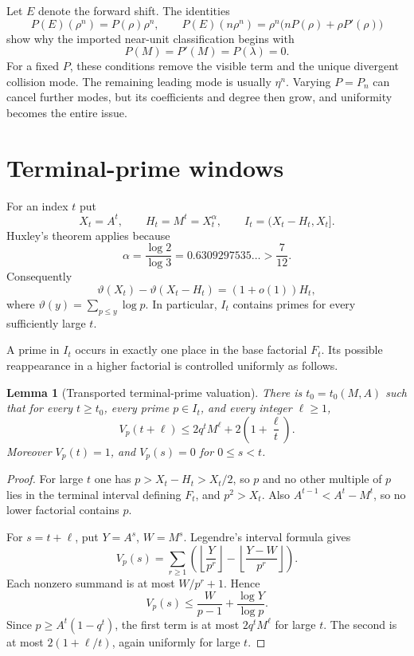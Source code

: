 \documentclass[11pt,oneside]{article}
\newtheorem{lemma}[theorem]{Lemma}
\theoremstyle{definition}
\theoremstyle{remark}
\newcommand{\thetas}{\vartheta}
\begin{document}
Let $E$ denote the forward shift.  The identities
\[
 P(E)(\rho^n)=P(\rho)\rho^n,
 \qquad
 P(E)(n\rho^n)=\rho^n\bigl(nP(\rho)+\rho P'(\rho)\bigr)
\]
show why the imported near-unit classification begins with
\[
 P(M)=P'(M)=P(\lambda)=0.                    \label{eq:basic-annihilation}
\]
For a fixed $P$, these conditions remove the visible term and the unique divergent collision
mode.  The remaining leading mode is usually $\eta^n$.  Varying $P=P_n$ can cancel further
modes, but its coefficients and degree then grow, and uniformity becomes the entire issue.

\section{Terminal-prime windows}
\label{sec:windows}

For an index $t$ put
\[
 X_t=A^t,\qquad H_t=M^t=X_t^\alpha,
 \qquad I_t=(X_t-H_t,X_t].
\]
Huxley's theorem applies because
\[
 \alpha=\frac{\log2}{\log3}=0.6309297535\ldots>\frac7{12}.
\]
Consequently
\begin{equation}
 \thetas(X_t)-\thetas(X_t-H_t)=(1+o(1))H_t,
 \label{eq:huxley-window}
\end{equation}
where $\thetas(y)=\sum_{p\le y}\log p$.  In particular, $I_t$ contains primes for every
sufficiently large $t$.

A prime in $I_t$ occurs in exactly one place in the base factorial $F_t$.  Its possible
reappearance in a higher factorial is controlled uniformly as follows.

\begin{lemma}[Transported terminal-prime valuation]
\label{lem:transport-bound}
There is $t_0=t_0(M,A)$ such that for every $t\ge t_0$, every prime $p\in I_t$, and every
integer $\ell\ge1$,
\begin{equation}
 V_p(t+\ell)
 \le 2q^tM^\ell+2\left(1+\frac\ell t\right).          \label{eq:transport-bound}
\end{equation}
Moreover $V_p(t)=1$, and $V_p(s)=0$ for $0\le s<t$.
\end{lemma}

\begin{proof}
For large $t$ one has $p>X_t-H_t>X_t/2$, so $p$ and no other multiple of $p$ lies in the
terminal interval defining $F_t$, and $p^2>X_t$.  Also
$A^{t-1}<A^t-M^t$, so no lower factorial contains $p$.

For $s=t+\ell$, put $Y=A^s$, $W=M^s$.  Legendre's interval formula gives
\[
 V_p(s)=\sum_{r\ge1}
 \left(\left\lfloor\frac{Y}{p^r}\right\rfloor
 -\left\lfloor\frac{Y-W}{p^r}\right\rfloor\right).
\]
Each nonzero summand is at most $W/p^r+1$.  Hence
\[
 V_p(s)\le\frac{W}{p-1}+\frac{\log Y}{\log p}.
\]
Since $p\ge A^t(1-q^t)$, the first term is at most $2q^tM^\ell$ for large $t$.  The second is
at most $2(1+\ell/t)$, again uniformly for large $t$.
\end{proof}
\end{document}

